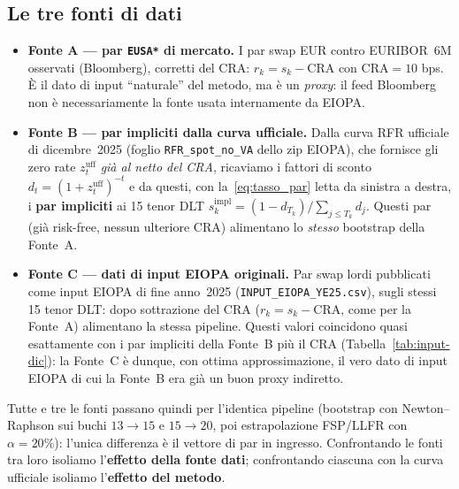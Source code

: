 \documentclass[11pt,a4paper]{article}
\theoremstyle{plain}
\theoremstyle{definition}
\theoremstyle{remark}
\newcommand{\CRA}{\mathrm{CRA}}
\begin{document}
\subsection{Le tre fonti di dati}
\label{sec:due-fonti}

\begin{itemize}
  \item \textbf{Fonte A --- par \texttt{EUSA*} di mercato.} I par swap EUR contro EURIBOR~6M
        osservati (Bloomberg), corretti del $\CRA$: $r_k = s_k - \CRA$ con $\CRA=10$ bps.
        \`E il dato di input ``naturale'' del metodo, ma \`e un \emph{proxy}: il feed Bloomberg
        non \`e necessariamente la fonte usata internamente da EIOPA.
  \item \textbf{Fonte B --- par impliciti dalla curva ufficiale.} Dalla curva RFR ufficiale
        di dicembre~2025 (foglio \texttt{RFR\_spot\_no\_VA} dello zip EIOPA), che fornisce gli
        zero rate $z_t^{\text{uff}}$ \emph{gi\`a al netto del CRA}, ricaviamo i fattori di
        sconto $d_t=(1+z_t^{\text{uff}})^{-t}$ e da questi, con la~\eqref{eq:tasso_par} letta
        da sinistra a destra, i \textbf{par impliciti} ai 15 tenor DLT
        $s_k^{\text{impl}}=(1-d_{T_k})/\sum_{j\le T_k}d_j$. Questi par (gi\`a risk-free, nessun
        ulteriore $\CRA$) alimentano lo \emph{stesso} bootstrap della Fonte~A.
  \item \textbf{Fonte C --- dati di input EIOPA originali.} Par swap lordi pubblicati come
        input EIOPA di fine anno~2025 (\texttt{INPUT\_EIOPA\_YE25.csv}), sugli stessi 15 tenor
        DLT: dopo sottrazione del $\CRA$ ($r_k = s_k - \CRA$, come per la Fonte~A) alimentano
        la stessa pipeline. Questi valori coincidono quasi esattamente con i par impliciti
        della Fonte~B pi\`u il $\CRA$ (Tabella~\ref{tab:input-dic}): la Fonte~C \`e dunque, con
        ottima approssimazione, il vero dato di input EIOPA di cui la Fonte~B era gi\`a un buon
        proxy indiretto.
\end{itemize}

Tutte e tre le fonti passano quindi per l'identica pipeline (bootstrap con Newton--Raphson sui
buchi $13\!\to\!15$ e $15\!\to\!20$, poi estrapolazione FSP/LLFR con $\alpha=20\%$): l'unica
differenza \`e il vettore di par in ingresso. Confrontando le fonti tra loro isoliamo
l'\textbf{effetto della fonte dati}; confrontando ciascuna con la curva ufficiale isoliamo
l'\textbf{effetto del metodo}.
\end{document}
